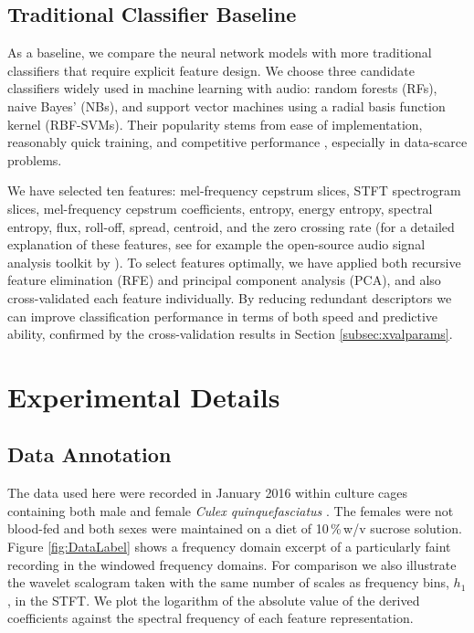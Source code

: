 \documentclass[10pt, twocolumn]{llncs}
\begin{document}
\subsection{Traditional Classifier Baseline}
As a baseline, we compare the neural network models with more traditional classifiers that require explicit feature design. We choose three candidate classifiers widely used in machine learning with audio: random forests (RFs), naive Bayes' (NBs), and support vector machines using a radial basis function kernel (RBF-SVMs). Their popularity stems from ease of implementation, reasonably quick training, and competitive performance \cite{silva2013applying}, especially in data-scarce problems. 

We have selected ten features: mel-frequency cepstrum slices, STFT spectrogram slices,  mel-frequency cepstrum coefficients, entropy, energy entropy, spectral entropy, flux, roll-off, spread, centroid, and the zero crossing rate (for a detailed explanation of these features, see for example the open-source audio signal analysis toolkit by \cite{giannakopoulos2015pyaudioanalysis}). To select features optimally, we have applied both recursive feature elimination (RFE) and principal component analysis (PCA), and also cross-validated each feature individually. By reducing redundant descriptors we can improve classification performance in terms of both speed and predictive ability, confirmed by the cross-validation results in Section \ref{subsec:xvalparams}.


\section{Experimental Details}
\label{sec:ExperDetails}
\subsection{Data Annotation}
The data used here were recorded in January 2016 within culture cages containing both male and female \emph{Culex quinquefasciatus} \cite{bhattacharya2016southern}. The females were not blood-fed and both sexes were maintained on a diet of 10\,\%\,w/v sucrose solution. Figure \ref{fig:DataLabel} shows a frequency domain excerpt of a particularly faint recording in the windowed frequency domains. 
For comparison we also illustrate the wavelet scalogram taken with the same number of scales as frequency bins, $h_1$, in the STFT. We plot the logarithm of the absolute value of the derived coefficients against the spectral frequency of each feature representation.
\end{document}

